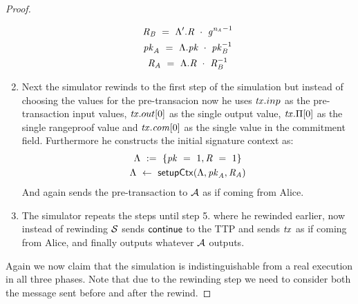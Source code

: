 \begin{proof}
\begin{enumerate}
\begin{gather*}
            \mathit{R}_{\mathit{B}} ~=~ {\Lambda}'.\mathit{R} ~\cdot~ {\mathit{g}^{\mathit{\mathit{n}_{\mathit{A}}}}}^{-1} \\
            \mathit{pk}_{\mathit{A}} ~=~ \Lambda.\mathit{pk} ~\cdot~ \mathit{pk}_{\mathit{B}}^{-1} \\
            \mathit{R}_{\mathit{A}} ~=~ \Lambda.\mathit{R} ~\cdot~ \mathit{R}_{\mathit{B}}^{-1}
        \end{gather*}
        \item Next the simulator rewinds to the first step of the simulation but instead of choosing the values for the pre-transacion now he uses $\mathit{tx}.inp$ as the pre-transaction input values, $\mathit{tx}.out[0]$ as the single output value, $\mathit{tx}.\Pi[0]$ as the single rangeproof value and $\mathit{tx}.\mathit{com}[0]$ as the single value in the commitment field.
        Furthermore he constructs the initial signature context as:
        \begin{gather*}
            \Lambda ~:=~ \{ \mathit{pk} ~=~ 1, \mathit{R} ~=~ 1 \} \\
            \Lambda ~\leftarrow~ \mathsf{setupCtx}( \Lambda, \mathit{pk}_{\mathit{A}}, \mathit{R}_{\mathit{A}} )
        \end{gather*}
        And again sends the pre-transaction to $\mathcal{A}$ as if coming from Alice.
        \item The simulator repeats the steps until step 5. where he rewinded earlier, now instead of rewinding $\mathcal{S}$ sends $\mathsf{continue}$ to the TTP and sends $\mathit{tx}$ as if coming from Alice, and finally outputs whatever $\mathcal{A}$ outputs.
    \end{enumerate}

    Again we now claim that the simulation is indistinguishable from a real execution in all three phases.
    Note that due to the rewinding step we need to consider both the message sent before and after the rewind.


\end{proof}
